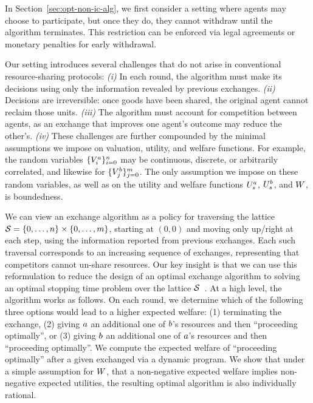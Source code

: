 In Section~\ref{sec:opt-non-ic-alg}, we first consider a setting where agents may choose to participate, but once they do, they cannot withdraw until the algorithm terminates. This restriction can be enforced via legal agreements or monetary penalties for early withdrawal.



Our setting introduces several challenges that do not arise in conventional resource-sharing protocols:
\emph{(i)}
In each round, the algorithm must make its decisions using only the information revealed by previous exchanges.
\emph{(ii)}
Decisions are irreversible: once goods have been shared, the original agent cannot reclaim those units.
\emph{(iii)}
The algorithm must account for competition between agents, as an exchange that improves one agent's outcome may reduce the other's.
\emph{(iv)}
These challenges are further compounded by the minimal assumptions we impose on valuation, utility, and welfare functions. For example, the random variables
\(
\{V^a_{i}\}_{i=0}^{n}
\)
may be continuous, discrete, or arbitrarily correlated, and likewise for
\(
\{V^b_{j}\}_{j=0}^{m}
\).
The only assumption we impose on these random variables, as well as on the utility and welfare functions $U^a_{s}$, $U^b_{s}$, and $W$, is boundedness.





We can view an exchange algorithm as a policy for traversing the lattice 
\(
    \mathcal{S}
    =
    \left\{0,\ldots,n\right\}
    \times
    \left\{0,\ldots,m\right\}
\), 
starting at $(0,0)$ and moving only up/right at each step, using the information 
reported from previous exchanges.
Each such traversal corresponds to an increasing sequence of exchanges, representing that competitors
cannot un-share resources.
Our key insight is that we can use this reformulation to reduce the design of an optimal exchange
algorithm to solving an optimal stopping time problem over the lattice $\mathcal{S}$~\citep{mandelbaum1981optimal}.
At a high level, the algorithm works as follows. On each round, we determine which of the following three options would lead to 
a higher expected welfare: (1) terminating the exchange, (2) giving $a$ an additional one of 
$b$'s resources and then ``proceeding optimally'', or (3) giving $b$ an additional one of $a$'s
resources and then ``proceeding optimally''.
We compute the expected welfare of ``proceeding optimally'' after a given exchanged via a dynamic program.
We show that under a simple assumption for $W$, that a non-negative expected welfare implies
non-negative expected utilities,
the resulting optimal algorithm is 
also individually rational.




